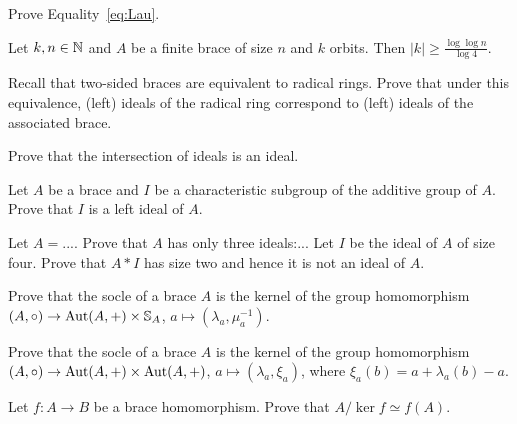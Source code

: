 \begin{prob}
\label{prob:Lau}
    Prove Equality~\eqref{eq:Lau}.
\end{prob}

\begin{prob}
\label{prob:Landau}
Let $k,n\in\mathbb{N}$ and $A$ be a finite brace of size $n$ and $k$ orbits. 
Then $|k|\geq\frac{\log\log n}{\log 4}$. 
\end{prob}


\begin{prob}
\label{prob:radical}
Recall that two-sided braces are equivalent to radical rings. Prove that under this equivalence, 
(left) ideals of the radical ring correspond to (left) ideals of the associated brace. 
\end{prob}

\begin{prob}
\label{prob:sum_ideals}
Prove that the intersection of ideals is an ideal. 
\end{prob}

\begin{prob}
Let $A$ be a brace and $I$ be a characteristic subgroup of the additive group of $A$. Prove that
$I$ is a left ideal of $A$. 
\end{prob}

\begin{prob}
Let $A=...$. Prove that $A$ has only three ideals:... Let $I$ be the ideal of $A$ of size four. Prove that
$A*I$ has size two and hence it is not an ideal of $A$. 
\end{prob}

\begin{prob}
\label{prob:Bachiller1}
Prove that the socle of a brace $A$ is the kernel of the 
group homomorphism $(A,\circ)\to\operatorname{Aut}(A,+)\times\mathbb{S}_A$, $a\mapsto (\lambda_a,\mu_a^{-1})$. 
\end{prob}

\begin{prob}
\label{prob:Bachiller2}
Prove that the socle of a brace $A$ is the kernel of the 
group homomorphism $(A,\circ)\to\operatorname{Aut}(A,+)\times\operatorname{Aut}(A,+)$, $a\mapsto (\lambda_a,\xi_a)$, where
$\xi_a(b)=a+\lambda_a(b)-a$. 
\end{prob}

\begin{prob}
\label{prob:iso1}
    Let $f\colon A\to B$ be a brace homomorphism. Prove that $A/\ker f\simeq f(A)$. 
\end{prob}

